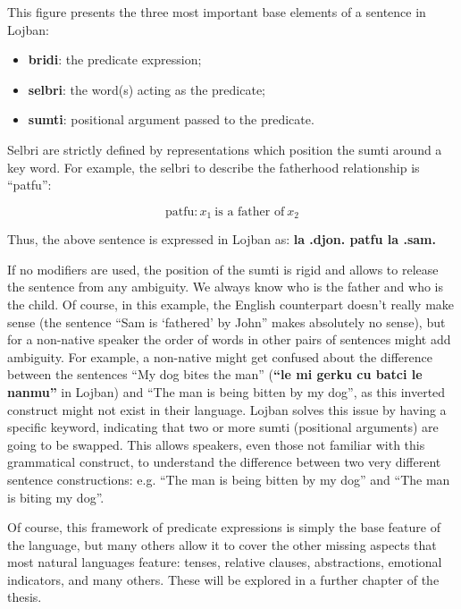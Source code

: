 This figure presents the three most important base elements of a sentence in Lojban:

\begin{itemize}
    \item \textbf{bridi}: the predicate expression;
    \item \textbf{selbri}: the word(s) acting as the predicate;
    \item \textbf{sumti}: positional argument passed to the predicate.
\end{itemize}

Selbri are strictly defined by representations which position the sumti around a key word. For example, the selbri to describe the fatherhood relationship is ``patfu'':

$$\text{patfu}: x_1 \: \text{is a father of} \: x_2$$

Thus, the above sentence is expressed in Lojban as: \textbf{la .djon. patfu la .sam.} \newline

If no modifiers are used, the position of the sumti is rigid and allows to release the sentence from any ambiguity. We always know who is the father and who is the child.
Of course, in this example, the English counterpart doesn't really make sense (the sentence ``Sam is `fathered' by John'' makes absolutely no sense), but for a non-native speaker
the order of words in other pairs of sentences might add ambiguity. For example, a non-native might get confused about the difference between the sentences
``My dog bites the man'' (\textbf{``le mi gerku cu batci le nanmu''} in Lojban) and ``The man is being bitten by my dog'', as this inverted construct might not exist in their language.
Lojban solves this issue by having a specific keyword, indicating that two or more sumti (positional arguments) are going to be swapped. This allows speakers, even those not
familiar with this grammatical construct, to understand the difference between two very different sentence constructions: e.g. ``The man is being bitten by my dog''
and ``The man is biting my dog''.\newline

Of course, this framework of predicate expressions is simply the base feature of the language, but many others allow it to cover the other missing aspects that most natural
languages feature: tenses, relative clauses, abstractions, emotional indicators, and many others. These will be explored in a further chapter of the thesis. \newline

